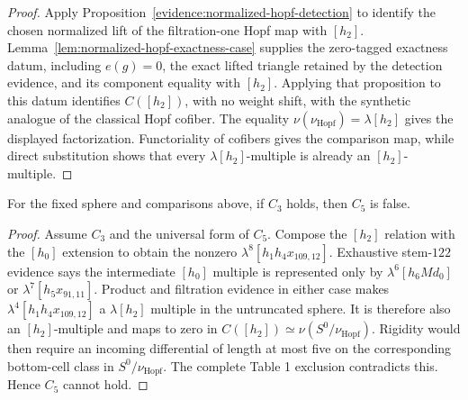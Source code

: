 \begin{proof}
  Apply Proposition~\ref{evidence:normalized-hopf-detection} to identify the
  chosen normalized lift of the filtration-one Hopf map with $[h_2]$.
  Lemma~\ref{lem:normalized-hopf-exactness-case} supplies the zero-tagged
  exactness datum, including $e(g)=0$, the exact lifted triangle retained by
  the detection evidence, and its component equality with $[h_2]$.  Applying that proposition
  to this datum identifies $C([h_2])$, with no weight shift, with the synthetic
  analogue of the classical Hopf cofiber.  The equality
  $\nu(\nu_{\mathrm{Hopf}})=\lambda[h_2]$ gives the displayed factorization.
  Functoriality of cofibers gives the comparison map, while direct substitution
  shows that every $\lambda[h_2]$-multiple is already an $[h_2]$-multiple.
\end{proof}

\begin{proposition}[$C_3$ excludes $C_5$]
  \label{prop:near126-c3-not-c5}
  \notready
  For the fixed sphere and comparisons above, if $C_3$ holds, then $C_5$ is false.
\end{proposition}

\begin{proof}
  Assume $C_3$ and the universal form of $C_5$.  Compose the $[h_2]$ relation
  with the $[h_0]$ extension to obtain the nonzero
  $\lambda^8[h_1h_4x_{109,12}]$.  Exhaustive stem-$122$ evidence says the
  intermediate $[h_0]$ multiple is represented only by
  $\lambda^6[h_6Md_0]$ or $\lambda^7[h_5x_{91,11}]$.  Product and filtration
  evidence in either case makes
  $\lambda^4[h_1h_4x_{109,12}]$ a $\lambda[h_2]$ multiple in the untruncated
  sphere.  It is therefore also an $[h_2]$-multiple and maps to zero in
  $C([h_2])\simeq\nu(S^0/\nu_{\mathrm{Hopf}})$.  Rigidity would then require an
  incoming differential of length at most five on the corresponding
  bottom-cell class in $S^0/\nu_{\mathrm{Hopf}}$.  The complete Table 1 exclusion
  contradicts this.  Hence $C_5$ cannot hold.
\end{proof}



